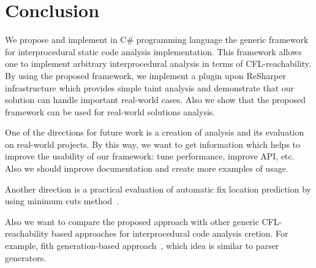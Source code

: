 \section{Conclusion}

We propose and implement in C\# programming language the generic framework for interprocedural static code analysis implementation.
This framework allows one to implement arbitrary interprocedural analysis in terms of CFL-reachability.
By using the proposed framework, we implement a plugin upon ReSharper infrastructure which provides simple taint analysis and demonstrate that our solution can handle important real-world cases.
Also we show that the proposed framework can be used for real-world solutions analysis.

One of the directions for future work is a creation of analysis and its evaluation on real-world projects.
By this way, we want to get information which helps to improve the usability of our framework: tune performance, improve API, etc.
Also we should improve documentation and create more examples of usage.

Another direction is a practical evaluation of automatic fix location prediction by using minimum cuts method~\cite{10.1007/978-3-319-63390-9_27}.

Also we want to compare the proposed approach with other generic CFL-reachability based approaches for interprocedural code analysis cretion. For example, fith generation-based approach~\cite{LPAR-21:Cauliflower_Solver_Generator_for}, which idea is similar to parser generators.
